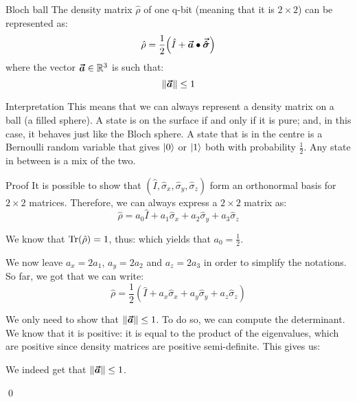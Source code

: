 \documentclass[a4paper]{article}
\begin{document}
\begin{parag}{Bloch ball}
    The density matrix $\hat{\rho}$ of one q-bit (meaning that it is $2\times2$) can be represented as: 
    \[\hat{\rho} = \frac{1}{2}\left(\hat{I} + \bvec{a} \dotprod \bvec{\hat{\sigma}}\right)\]
    where the vector $\bm{\protect\vec{a}} \in \mathbb{R}^3$ is such that: 
    \[\left\|\bvec{a}\right\| \leq 1\]
    
    \begin{subparag}{Interpretation}
        This means that we can always represent a density matrix on a ball (a filled sphere). A state is on the surface if and only if it is pure; and, in this case, it behaves just like the Bloch sphere. A state that is in the centre is a Bernoulli random variable that gives $\ket{0}$ or $\ket{1}$ both with probability $\frac{1}{2}$. Any state in between is a mix of the two.
    \end{subparag}
    
    \begin{subparag}{Proof}
        It is possible to show that $\left(\hat{I}, \hat{\sigma}_x, \hat{\sigma}_y, \hat{\sigma}_z\right)$ form an orthonormal basis for $2\times2$ matrices. Therefore, we can always express a $2 \times 2$ matrix as: 
        \[\hat{\rho} = a_0 \hat{I} + a_1 \hat{\sigma}_x + a_2 \hat{\sigma}_y + a_3 \hat{\sigma}_z\]

        We know that $\Tr\left(\hat{\rho}\right) = 1$, thus: 
        which yields that $a_0 = \frac{1}{2}$.

        We now leave $a_x = 2a_1$, $a_y = 2a_2$ and $a_z = 2a_3$ in order to simplify the notations. So far, we got that we can write: 
        \[\hat{\rho} = \frac{1}{2}\left(\hat{I} + a_x \hat{\sigma}_x + a_y \hat{\sigma}_y + a_z \hat{\sigma}_z\right)\]
        
        We only need to show that $\left\|\bvec{a}\right\| \leq 1$. To do so, we can compute the determinant. We know that it is positive: it is equal to the product of the eigenvalues, which are positive since density matrices are positive semi-definite. This gives us:
        
        We indeed get that $\left\|\bvec{a}\right\| \leq 1$.

        \qed
    \end{subparag}
\end{parag}
\end{document}
